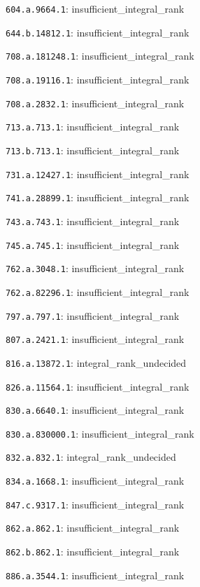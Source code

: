 \documentclass[10pt]{article}
\begin{document}
\begin{landscape}
\par\noindent\texttt{604.a.9664.1}: insufficient\_integral\_rank
\par\noindent\texttt{644.b.14812.1}: insufficient\_integral\_rank
\par\noindent\texttt{708.a.181248.1}: insufficient\_integral\_rank
\par\noindent\texttt{708.a.19116.1}: insufficient\_integral\_rank
\par\noindent\texttt{708.a.2832.1}: insufficient\_integral\_rank
\par\noindent\texttt{713.a.713.1}: insufficient\_integral\_rank
\par\noindent\texttt{713.b.713.1}: insufficient\_integral\_rank
\par\noindent\texttt{731.a.12427.1}: insufficient\_integral\_rank
\par\noindent\texttt{741.a.28899.1}: insufficient\_integral\_rank
\par\noindent\texttt{743.a.743.1}: insufficient\_integral\_rank
\par\noindent\texttt{745.a.745.1}: insufficient\_integral\_rank
\par\noindent\texttt{762.a.3048.1}: insufficient\_integral\_rank
\par\noindent\texttt{762.a.82296.1}: insufficient\_integral\_rank
\par\noindent\texttt{797.a.797.1}: insufficient\_integral\_rank
\par\noindent\texttt{807.a.2421.1}: insufficient\_integral\_rank
\par\noindent\texttt{816.a.13872.1}: integral\_rank\_undecided
\par\noindent\texttt{826.a.11564.1}: insufficient\_integral\_rank
\par\noindent\texttt{830.a.6640.1}: insufficient\_integral\_rank
\par\noindent\texttt{830.a.830000.1}: insufficient\_integral\_rank
\par\noindent\texttt{832.a.832.1}: integral\_rank\_undecided
\par\noindent\texttt{834.a.1668.1}: insufficient\_integral\_rank
\par\noindent\texttt{847.c.9317.1}: insufficient\_integral\_rank
\par\noindent\texttt{862.a.862.1}: insufficient\_integral\_rank
\par\noindent\texttt{862.b.862.1}: insufficient\_integral\_rank
\par\noindent\texttt{886.a.3544.1}: insufficient\_integral\_rank

\end{landscape}
\end{document}
